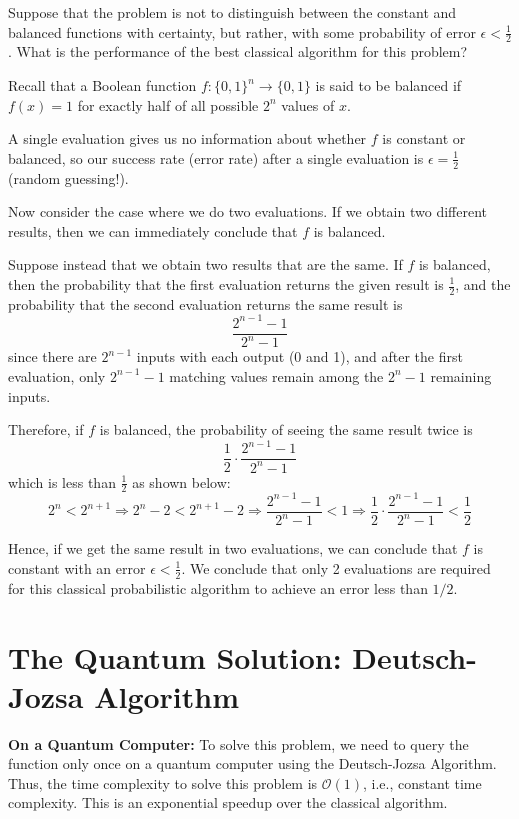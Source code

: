 \begin{example}
Suppose that the problem is not to distinguish between the constant and balanced functions with certainty, but rather, with some probability of error $\epsilon < \frac{1}{2}$. What is the performance of the best classical algorithm for this problem?

Recall that a Boolean function $f : \{0,1\}^n \rightarrow \{0,1\}$ is said to be balanced if $f(x) = 1$ for exactly half of all possible $2^n$ values of $x$.

A single evaluation gives us no information about whether $f$ is constant or balanced, so our success rate (error rate) after a single evaluation is $\epsilon = \frac{1}{2}$ (random guessing!). 

Now consider the case where we do two evaluations. If we obtain two different results, then we can immediately conclude that $f$ is balanced.

Suppose instead that we obtain two results that are the same. If $f$ is balanced, then the probability that the first evaluation returns the given result is $\frac{1}{2}$, and the probability that the second evaluation returns the same result is
\[
\frac{2^{n-1} - 1}{2^n - 1}
\]
since there are $2^{n-1}$ inputs with each output (0 and 1), and after the first evaluation, only $2^{n-1} - 1$ matching values remain among the $2^n - 1$ remaining inputs.

Therefore, if $f$ is balanced, the probability of seeing the same result twice is
\[
\frac{1}{2} \cdot \frac{2^{n-1} - 1}{2^n - 1}
\]
which is less than $\frac{1}{2}$ as shown below:
\[
2^n < 2^{n+1} \Rightarrow 2^n - 2 < 2^{n+1} - 2 \Rightarrow \frac{2^{n-1} - 1}{2^n - 1} < 1 \Rightarrow \frac{1}{2} \cdot \frac{2^{n-1} - 1}{2^n - 1} < \frac{1}{2}
\]

Hence, if we get the same result in two evaluations, we can conclude that $f$ is constant with an error $\epsilon < \frac{1}{2}$. We conclude that only 2 evaluations are required for this classical probabilistic algorithm to achieve an error less than $1/2$.
\end{example}

\section{The Quantum Solution: Deutsch-Jozsa Algorithm}
\textbf{On a Quantum Computer:} To solve this problem, we need to query the function only once on a quantum computer using the Deutsch-Jozsa Algorithm. Thus, the time complexity to solve this problem is $\mathcal{O}(1)$, i.e., constant time complexity. This is an exponential speedup over the classical algorithm.

